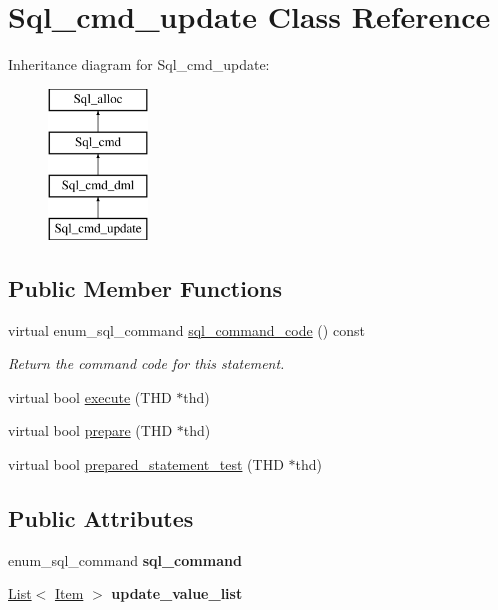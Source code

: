 \hypertarget{classSql__cmd__update}{}\section{Sql\+\_\+cmd\+\_\+update Class Reference}
\label{classSql__cmd__update}
Inheritance diagram for Sql\+\_\+cmd\+\_\+update\+:\begin{figure}[H]
\begin{center}
\leavevmode
\includegraphics[height=4.000000cm]{classSql__cmd__update}
\end{center}
\end{figure}
\subsection*{Public Member Functions}
\begin{DoxyCompactItemize}
\item 
\mbox{\label{classSql__cmd__update_a11ca65a1dc0b16ae2ad22dd419bdaa55}} 
virtual enum\+\_\+sql\+\_\+command \mbox{\hyperlink{classSql__cmd__update_a11ca65a1dc0b16ae2ad22dd419bdaa55}{sql\+\_\+command\+\_\+code}} () const
\begin{DoxyCompactList}\small\item\em Return the command code for this statement. \end{DoxyCompactList}\item 
virtual bool \mbox{\hyperlink{classSql__cmd__update_a948016f5dbbc804c7fcd5e0cf75364bc}{execute}} (T\+HD $\ast$thd)
\item 
virtual bool \mbox{\hyperlink{classSql__cmd__update_af3b765bea10980878c0d4c0e677ce88f}{prepare}} (T\+HD $\ast$thd)
\item 
virtual bool \mbox{\hyperlink{classSql__cmd__update_ae0fcfae54301cb796e4bc9adfc2c8ec5}{prepared\+\_\+statement\+\_\+test}} (T\+HD $\ast$thd)
\end{DoxyCompactItemize}
\subsection*{Public Attributes}
\begin{DoxyCompactItemize}
\item 
\mbox{\label{classSql__cmd__update_a3e5531d562c0a87cd1599e75df1db647}} 
enum\+\_\+sql\+\_\+command {\bfseries sql\+\_\+command}
\item 
\mbox{\label{classSql__cmd__update_ae0dcf6b7d9c00024ee242ecdff1b3dad}} 
\mbox{\hyperlink{classList}{List}}$<$ \mbox{\hyperlink{classItem}{Item}} $>$ {\bfseries update\+\_\+value\+\_\+list}
\end{DoxyCompactItemize}

